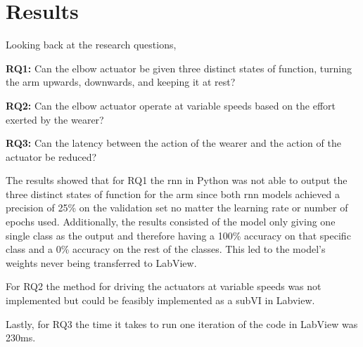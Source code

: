 \section{Results}
\label{section:results}

%
%
%
Looking back at the research questions,

\textbf{RQ1:} Can the elbow actuator be given three distinct states of function, turning the arm upwards, downwards, and keeping it at rest?

\textbf{RQ2:} Can the elbow actuator operate at variable speeds based on the effort exerted by the wearer?

\textbf{RQ3:} Can the latency between the action of the wearer and the action of the actuator be reduced?

The results showed that for RQ1 the \acrshort{rnn} in Python was not able to output the three distinct states of 
function for the arm since both \acrshort{rnn} models achieved a precision of 25\% on the validation set no matter the
learning rate or number of epochs used. Additionally, the results consisted of the model only giving one single class as the output
and therefore having a 100\% accuracy on that specific class and a 0\% accuracy on the rest of the classes. 
This led to the model's weights never being transferred to LabView.

For RQ2 the method for driving the actuators at variable speeds was not implemented but could be feasibly implemented as a subVI in Labview.  

Lastly, for RQ3 the time it takes to run one iteration of the code in LabView was 230ms.